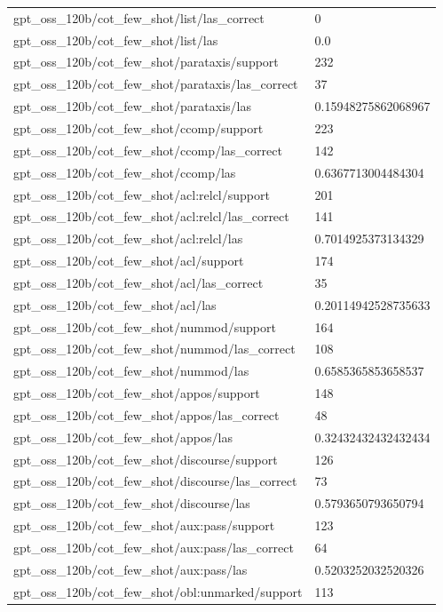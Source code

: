 \begin{tabular}{ll}
gpt\_oss\_120b/cot\_few\_shot/list/las\_correct & 0 \\
gpt\_oss\_120b/cot\_few\_shot/list/las & 0.0 \\
gpt\_oss\_120b/cot\_few\_shot/parataxis/support & 232 \\
gpt\_oss\_120b/cot\_few\_shot/parataxis/las\_correct & 37 \\
gpt\_oss\_120b/cot\_few\_shot/parataxis/las & 0.15948275862068967 \\
gpt\_oss\_120b/cot\_few\_shot/ccomp/support & 223 \\
gpt\_oss\_120b/cot\_few\_shot/ccomp/las\_correct & 142 \\
gpt\_oss\_120b/cot\_few\_shot/ccomp/las & 0.6367713004484304 \\
gpt\_oss\_120b/cot\_few\_shot/acl:relcl/support & 201 \\
gpt\_oss\_120b/cot\_few\_shot/acl:relcl/las\_correct & 141 \\
gpt\_oss\_120b/cot\_few\_shot/acl:relcl/las & 0.7014925373134329 \\
gpt\_oss\_120b/cot\_few\_shot/acl/support & 174 \\
gpt\_oss\_120b/cot\_few\_shot/acl/las\_correct & 35 \\
gpt\_oss\_120b/cot\_few\_shot/acl/las & 0.20114942528735633 \\
gpt\_oss\_120b/cot\_few\_shot/nummod/support & 164 \\
gpt\_oss\_120b/cot\_few\_shot/nummod/las\_correct & 108 \\
gpt\_oss\_120b/cot\_few\_shot/nummod/las & 0.6585365853658537 \\
gpt\_oss\_120b/cot\_few\_shot/appos/support & 148 \\
gpt\_oss\_120b/cot\_few\_shot/appos/las\_correct & 48 \\
gpt\_oss\_120b/cot\_few\_shot/appos/las & 0.32432432432432434 \\
gpt\_oss\_120b/cot\_few\_shot/discourse/support & 126 \\
gpt\_oss\_120b/cot\_few\_shot/discourse/las\_correct & 73 \\
gpt\_oss\_120b/cot\_few\_shot/discourse/las & 0.5793650793650794 \\
gpt\_oss\_120b/cot\_few\_shot/aux:pass/support & 123 \\
gpt\_oss\_120b/cot\_few\_shot/aux:pass/las\_correct & 64 \\
gpt\_oss\_120b/cot\_few\_shot/aux:pass/las & 0.5203252032520326 \\
gpt\_oss\_120b/cot\_few\_shot/obl:unmarked/support & 113 \\

\end{tabular}
